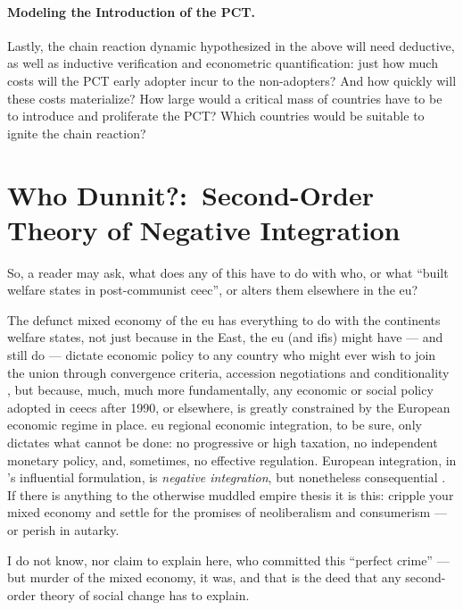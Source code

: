 \paragraph{Modeling the Introduction of the PCT.}
Lastly, the chain reaction dynamic hypothesized in the above will need deductive, as well as inductive verification and econometric quantification:
just how much costs will the PCT early adopter incur to the non-adopters?
And how quickly will these costs materialize?
How large would a critical mass of countries have to be to introduce and proliferate the PCT?
Which countries would be suitable to ignite the chain reaction?
\clearpage

\section{Who Dunnit?:\ Second-Order Theory of Negative Integration}
	\label{sec:who-dunnit}

So, a reader may ask, what does any of this have to do with who, or what  ``built welfare states in post-communist \gls{ceec}'', or alters them elsewhere in the \gls{eu}?

The defunct mixed economy of the \gls{eu} has everything to do with the continents welfare states, not just because in the East, the \gls{eu} (and \glspl{ifi}) might have --- and still do --- dictate economic policy to any country who might ever wish to join the union through convergence criteria, accession negotiations and conditionality \citep[55]{Bonker2006}, but because, much, much more fundamentally, any economic or social policy adopted in \glspl{ceec} after 1990, or elsewhere, is greatly constrained by the European economic regime in place.
\gls{eu} regional economic integration, to be sure, only dictates what cannot be done:
no progressive or high taxation, no independent monetary policy, and, sometimes, no effective regulation.
European integration, in \citeauthor{Scharpf1997}'s influential formulation, is \emph{negative integration}, but nonetheless consequential \citep{Scharpf1997}.
If there is anything to the otherwise muddled empire thesis \citep{BeckGrande-2007-aa} it is this:
cripple your mixed economy and settle for the promises of neoliberalism and consumerism --- or perish in autarky.

I do not know, nor claim to explain here, who committed this ``perfect crime'' \citep{Galbraith2002a} --- but murder of the mixed economy, it was, and that is the deed that any second-order theory of social change has to explain.


